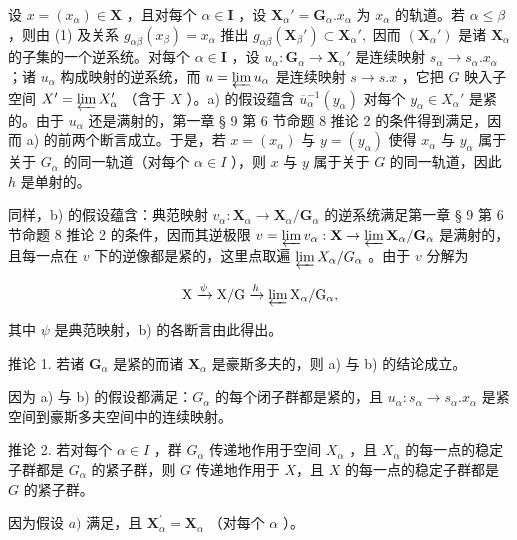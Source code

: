 设 \(x = (x_{\alpha}) \in \mathbf{X}\) ，且对每个 \(\alpha \in \mathbf{I}\) ，设 \(\mathbf{X}_{\alpha}' = \mathbf{G}_{\alpha}.x_{\alpha}\) 为 \(x_{\alpha}\) 的轨道。若 \(\alpha \leqslant \beta\) ，则由 (1) 及关系 \(g_{\alpha\beta}(x_{\beta}) = x_{\alpha}\) 推出 \(g_{\alpha\beta}(\mathbf{X}_{\beta}') \subset \mathbf{X}_{\alpha}',\) 因而 \((\mathbf{X}_{\alpha}')\) 是诸 \(\mathbf{X}_{\alpha}\) 的子集的一个逆系统。对每个 \(\alpha \in \mathbf{I}\) ，设 \(u_{\alpha}: \mathbf{G}_{\alpha} \to \mathbf{X}_{\alpha}'\) 是连续映射 \(s_{\alpha} \to s_{\alpha}.x_{\alpha}\) ；诸 \(u_{\alpha}\) 构成映射的逆系统，而 \(u = \varprojlim u_{\alpha}\) 是连续映射 \(s \to s.x\) ，它把 \(G\) 映入子空间 \(X' = \varprojlim X_{\alpha}'\) （含于 \(X\) ）。a) 的假设蕴含 \(\overline{u}_{\alpha}^{-1}(y_{\alpha})\) 对每个 \(y_{\alpha} \in X_{\alpha}'\) 是紧的。由于 \(u_{\alpha}\) 还是满射的，第一章 § 9 第 6 节命题 8 推论 2 的条件得到满足，因而 a) 的前两个断言成立。于是，若 \(x = (x_{\alpha})\) 与 \(y = (y_{\alpha})\) 使得 \(x_{\alpha}\) 与 \(y_{\alpha}\) 属于关于 \(G_{\alpha}\) 的同一轨道（对每个 \(\alpha \in I\) ），则 \(x\) 与 \(y\) 属于关于 \(G\) 的同一轨道，因此 \(h\) 是单射的。

同样，b) 的假设蕴含：典范映射 \(v_{\alpha}: \mathbf{X}_{\alpha} \to \mathbf{X}_{\alpha}/\mathbf{G}_{\alpha}\) 的逆系统满足第一章 § 9 第 6 节命题 8 推论 2 的条件，因而其逆极限 \(v = \varprojlim v_{\alpha}: \mathbf{X} \to \varprojlim \mathbf{X}_{\alpha}/\mathbf{G}_{\alpha}\) 是满射的，且每一点在 \(v\) 下的逆像都是紧的，这里点取遍 \(\varprojlim X_{\alpha}/G_{\alpha}\) 。由于 \(v\) 分解为

\[
\mathrm{X} \xrightarrow {\psi} \mathrm{X} / \mathrm{G} \xrightarrow {h} \varprojlim \mathrm{X} _ {\alpha} / \mathrm{G} _ {\alpha},
\]

其中 \(\psi\) 是典范映射，b) 的各断言由此得出。

推论 1. 若诸 \(\mathbf{G}_{\alpha}\) 是紧的而诸 \(\mathbf{X}_{\alpha}\) 是豪斯多夫的，则 a) 与 b) 的结论成立。

因为 a) 与 b) 的假设都满足：\(G_{\alpha}\) 的每个闭子群都是紧的，且 \(u_{\alpha}: s_{\alpha} \to s_{\alpha}.x_{\alpha}\) 是紧空间到豪斯多夫空间中的连续映射。

推论 2. 若对每个 \(\alpha \in I\) ，群 \(G_{\alpha}\) 传递地作用于空间 \(X_{\alpha}\) ，且 \(X_{\alpha}\) 的每一点的稳定子群都是 \(G_{\alpha}\) 的紧子群，则 \(G\) 传递地作用于 \(X\)，且 \(X\) 的每一点的稳定子群都是 \(G\) 的紧子群。

因为假设 \(a)\) 满足，且 \(\mathbf{X}_{\alpha}^{\prime} = \mathbf{X}_{\alpha}\) （对每个 \(\alpha\) ）。

